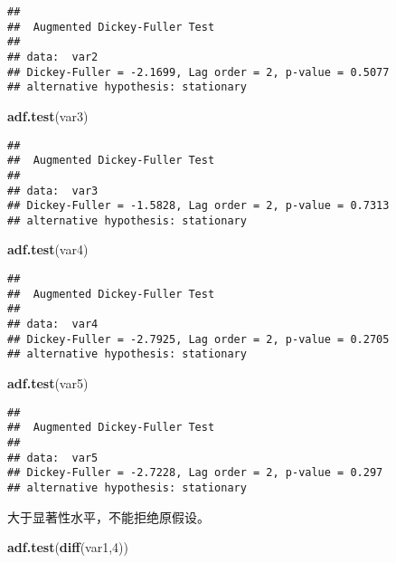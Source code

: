 \documentclass[]{article}
\newenvironment{Shaded}{\begin{snugshade}}{\end{snugshade}}
\newcommand{\KeywordTok}[1]{\textcolor[rgb]{0.13,0.29,0.53}{\textbf{{#1}}}}
\newcommand{\DecValTok}[1]{\textcolor[rgb]{0.00,0.00,0.81}{{#1}}}
\newcommand{\NormalTok}[1]{{#1}}
\begin{document}
\begin{verbatim}
## 
##  Augmented Dickey-Fuller Test
## 
## data:  var2
## Dickey-Fuller = -2.1699, Lag order = 2, p-value = 0.5077
## alternative hypothesis: stationary
\end{verbatim}

\begin{Shaded}
\begin{Highlighting}[]
\KeywordTok{adf.test}\NormalTok{(var3)}
\end{Highlighting}
\end{Shaded}

\begin{verbatim}
## 
##  Augmented Dickey-Fuller Test
## 
## data:  var3
## Dickey-Fuller = -1.5828, Lag order = 2, p-value = 0.7313
## alternative hypothesis: stationary
\end{verbatim}

\begin{Shaded}
\begin{Highlighting}[]
\KeywordTok{adf.test}\NormalTok{(var4)}
\end{Highlighting}
\end{Shaded}

\begin{verbatim}
## 
##  Augmented Dickey-Fuller Test
## 
## data:  var4
## Dickey-Fuller = -2.7925, Lag order = 2, p-value = 0.2705
## alternative hypothesis: stationary
\end{verbatim}

\begin{Shaded}
\begin{Highlighting}[]
\KeywordTok{adf.test}\NormalTok{(var5)}
\end{Highlighting}
\end{Shaded}

\begin{verbatim}
## 
##  Augmented Dickey-Fuller Test
## 
## data:  var5
## Dickey-Fuller = -2.7228, Lag order = 2, p-value = 0.297
## alternative hypothesis: stationary
\end{verbatim}

大于显著性水平，不能拒绝原假设。

\begin{Shaded}
\begin{Highlighting}[]
\KeywordTok{adf.test}\NormalTok{(}\KeywordTok{diff}\NormalTok{(var1,}\DecValTok{4}\NormalTok{))}
\end{Highlighting}
\end{Shaded}
\end{document}
